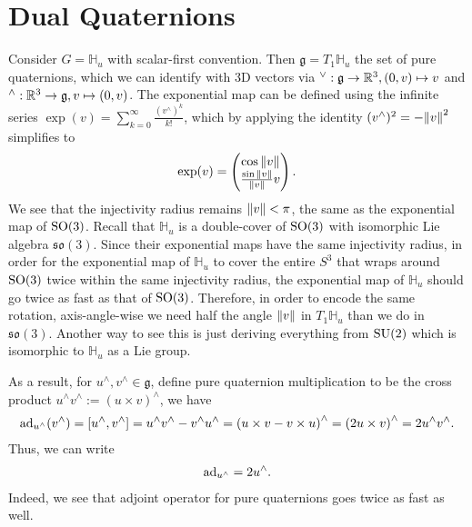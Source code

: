 \documentclass[12pt,class=article,crop=false]{standalone}
\begin{document}
\section{Dual Quaternions}

Consider $ G = \mathbb{ H}_u$ with scalar-first convention. Then $ \mathfrak{g} = T_1 \mathbb{ H}_u $ the set of pure quaternions, which we can identify with 3D vectors via $ ^\vee: \mathfrak{g} \to \mathbb{R}^3, (0,v) \mapsto v$ and $ ^\wedge : \mathbb{R}^3 \to \mathfrak{g},  v \mapsto (0,v)$. The exponential map can be defined using the infinite series $ \exp( v) = \sum_{ k= 0}^{\infty} \frac{(v^\wedge )^{k}}{ k!}$, which by applying the identity $ (v^\wedge)^2 = - {\left\lVert{ v}\right\rVert}^2 $ simplifies to
\begin{align*}
	\exp( v) = \begin{pmatrix} \cos {\left\lVert{ v}\right\rVert}\\ \frac{\sin {\left\lVert{ v}\right\rVert} }{{\left\lVert{ v}\right\rVert}  }v  \end{pmatrix} .
\end{align*}
We see that the injectivity radius remains $ {\left\lVert{ v}\right\rVert} < \pi$, the same as the exponential map of $ \operatorname{SO}(3)$. Recall that $ \mathbb{ H}_u $ is a double-cover of $ \operatorname{SO}(3)$ with isomorphic Lie algebra $ \mathfrak{so}(3)$. Since their exponential maps have the same injectivity radius, in order for the exponential map of $ \mathbb{ H}_u $ to cover the entire $ S^3$ that wraps around $ \operatorname{SO}(3)$ twice within the same injectivity radius, the exponential map of $ \mathbb{ H}_u $ should go twice as fast as that of $ \operatorname{SO}(3)$. Therefore, in order to encode the same rotation, axis-angle-wise we need half the angle $ {\left\lVert{ v}\right\rVert}$ in $ T_1 \mathbb{ H}_u $ than we do in $ \mathfrak{so}(3) $. Another way to see this is just deriving everything from $ \operatorname{SU}(2)$ which is isomorphic to  $ \mathbb{ H}_u $ as a Lie group.

As a result, for $ u^\wedge ,v^\wedge  \in \mathfrak{g} $, define pure quaternion multiplication to be the cross product $ u^\wedge v^\wedge := (u \times v)^\wedge$, we have
\begin{align*}
	\operatorname{ad}_{ u^\wedge }(v^\wedge ) = [u^\wedge ,v^\wedge ] = u^\wedge v^\wedge -v^\wedge u^\wedge  = \left(u \times v - v\times u   \right)^\wedge   = \left(2 u \times v \right)^\wedge = 2u^\wedge v^\wedge.
\end{align*}
Thus, we can write
\begin{align*}
	\operatorname{ad}_{ u^\wedge } = 2 u^\wedge .
\end{align*}
Indeed, we see that adjoint operator for pure quaternions goes twice as fast as well. 
\end{document}
